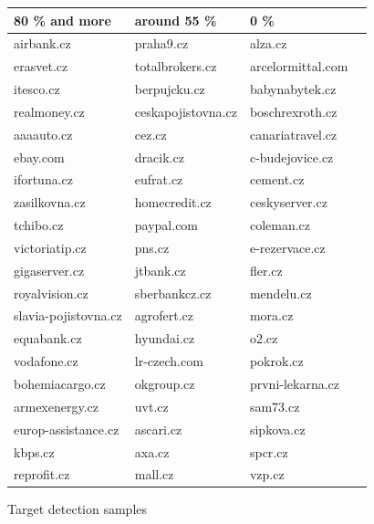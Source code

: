 \documentclass[thesis=B,english]{FITthesis}[2012/10/20]
\begin{document}
\begin{figure}[!ht]
    \centering
    \caption[Target detection samples]{Target detection samples\protect\footnotemark }
    \label{table_target_detection}

\begin{tabular}{|l|l|l|l|}
\hline
80 \% and more &  around 55 \%  &  0 \% \\ \hline \hline
airbank.cz &  praha9.cz &  alza.cz \\ \hline
erasvet.cz &  totalbrokers.cz &  arcelormittal.com  \\ \hline 
itesco.cz &  berpujcku.cz &  babynabytek.cz \\ \hline 
realmoney.cz &  ceskapojistovna.cz &  boschrexroth.cz \\ \hline 
aaaauto.cz &  cez.cz &  canariatravel.cz \\ \hline 
ebay.com &  dracik.cz &  c-budejovice.cz \\ \hline 
ifortuna.cz &  eufrat.cz &  cement.cz \\ \hline 
zasilkovna.cz &  homecredit.cz &  ceskyserver.cz \\ \hline 
tchibo.cz &  paypal.com &  coleman.cz \\ \hline 
victoriatip.cz &  pns.cz &  e-rezervace.cz \\ \hline 
gigaserver.cz &  jtbank.cz &  fler.cz \\ \hline 
royalvision.cz &  sberbankcz.cz &  mendelu.cz \\ \hline 
slavia-pojistovna.cz &  agrofert.cz &  mora.cz \\ \hline 
equabank.cz &  hyundai.cz &  o2.cz \\ \hline 
vodafone.cz &  lr-czech.com &  pokrok.cz \\ \hline 
bohemiacargo.cz &  okgroup.cz &  prvni-lekarna.cz \\ \hline 
armexenergy.cz &  uvt.cz &  sam73.cz \\ \hline 
europ-assistance.cz &  ascari.cz &  sipkova.cz \\ \hline 
kbps.cz &  axa.cz &  spcr.cz \\ \hline 
reprofit.cz &  mall.cz &  vzp.cz \\ \hline 
\end{tabular}

\end{figure}
\end{document}
